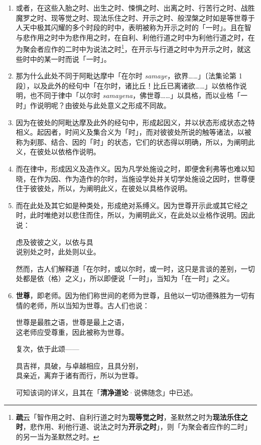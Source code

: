 \begin{enumerate}
\item 或者，在这些入胎之时、出生之时、悚惧之时、出离之时、行苦行之时、战胜魔罗之时、现等觉之时、现法乐住之时、开示之时、般涅槃之时如是等世尊于人天中极其闪耀的多个时段的时中，表明被称为开示之时的「一时」。且在智与悲作用之时中为悲作用之时，在自利、利他行道之时中为利他行道之时，在为聚会者应作的二时中为说法之时\footnote{\textbf{疏}云「智作用之时、自利行道之时为\textbf{现等觉之时}，圣默然之时为\textbf{现法乐住之时}，悲作用、利他行道、说法之时为\textbf{开示之时}」，则「为聚会者应作的二时」的另一当为圣默然之时。}，在开示与行道之时中为开示之时，就这些时中的某一时而说「一时」。
\item 那为什么此处不同于阿毗达摩中「在尔时 \textit{samaye}，欲界……」{\bluefootnotesize 〔法集论第 1 段〕}，以及此外的经句中「在尔时，诸比丘！比丘已离诸欲……」以依格作说明，也不同于律中「以尔时 \textit{samayena}，佛世尊……」以具格，而以业格「一时」作说明呢？由彼处与此处意义之形成不同故。
\item 因为在彼处的阿毗达摩及此外的经句中，形成起因义，并以状态形成状态之特相义。起因者，时间义及集合义为「时」，而对彼彼处所说的触等诸法，以被称为刹那、结合、因的「时」的状态，它们的状态得以明确，所以，为阐明此义，在彼处以依格作说明。
\item 而在律中，形成因义及造作义。因为凡学处施设之时，即便舍利弗等也难以知晓，在作为因、作为造作的尔时，当施设学处并关切学处施设之因时，世尊便住于彼彼处，所以，为阐明此义，在彼处以具格作说明。
\item 而在此处及其它如是种类处，形成绝对系缚义。因为世尊开示此或其它经之时，此时唯绝对以悲住而住，所以，为阐明此义，在此处以业格作说明。因此说：\begin{quoting}虑及彼彼之义，以依与具\\说别处之时，此处则以业。\end{quoting}然而，古人们解释道「在尔时，或以尔时，或一时，这只是言谈的差别，一切处都是依（格）之义」，所以即便说「一时」，当知为「在一时」之义。
\item \textbf{世尊}，即老师。因为他们称世间的老师为世尊，且他以一切功德殊胜为一切有情的老师，所以当知为世尊。古人们也说：\begin{quoting}世尊是最胜之语，世尊是最上之语，\\这老师应受尊重，因此被称为世尊。\end{quoting}复次，依于此颂——\begin{quoting}具吉祥，具破，与卓越相应，且具分别，\\具亲近，离弃于诸有而行，所以为世尊。\end{quoting}可知该词的详义，且其在「\textbf{清净道论}·说佛随念」中已述。

\end{enumerate}
